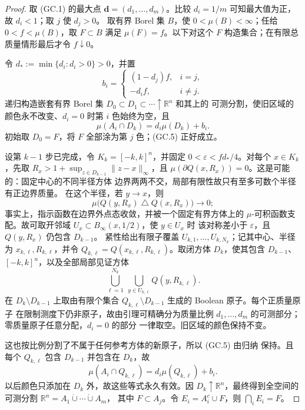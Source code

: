 \begin{proof}
取 (GC.1) 的最大点 $\boldsymbol d=(d_1,\ldots,d_m)$。比较
$d_i=1/m$ 可知最大值为正，故 $d_i<1$；取 $j$ 使 $d_j>0$。
取有界 Borel 集 $B$，使
$0<\mu(B)<\infty$；任给 $0<f<\mu(B)$，取 $F\subset B$ 满足
$\mu(F)=f$。以下对这个 $F$ 构造集合；在有限总质量情形最后才令
$f\downarrow0$。

令 $d_*:=\min\{d_i:d_i>0\}>0$，并置
\[
 b_i=\begin{cases}(1-d_j)f,&i=j,\\-d_if,&i\ne j.\end{cases} \tag{GC.4}
\]
递归构造嵌套有界 Borel 集
\(D_0\subset D_1\subset\cdots\uparrow\mathbb R^n\) 和其上的
可测分割，使旧区域的颜色永不改变、$d_i=0$ 时第 $i$ 色始终为空，且
\[
 \mu(A_i\cap D_k)=d_i\mu(D_k)+b_i. \tag{GC.5}
\]
初始取 $D_0=F$，将 $F$ 全部涂为第 $j$ 色；(GC.5) 正好成立。

设第 $k-1$ 步已完成，令 $K_k=[-k,k]^n$，并固定
$0<\varepsilon<fd_*/4$。对每个 $x\in K_k$，先取
\(R_x>1+\sup_{z\in D_{k-1}}\|z-x\|_\infty\)，且
\(\mu(\partial Q(x,R_x))=0\)。这是可能的：固定中心的不同半径方体
边界两两不交，局部有限性故只有至多可数个半径有正边界质量。
在这个半径，若 $y\to x$，则
\[
 \mu\bigl(Q(y,R_x)\mathbin\triangle Q(x,R_x)\bigr)\longrightarrow0; \tag{GC.6}
\]
事实上，指示函数在边界外点态收敛，并被一个固定有界方体上的
$\mu$-可积函数支配。故可取开邻域
\(U_x\subset B_\infty(x,1/2)\)，使 $y\in U_x$ 时
该对称差小于 $\varepsilon$，且 $Q(y,R_x)$ 仍包含 $D_{k-1}$。
紧性给出有限子覆盖 $U_{k,1},\ldots,U_{k,N_k}$；记其中心、半径为
$x_{k,\ell},R_{k,\ell}$，并令
$Q_{k,\ell}=Q(x_{k,\ell},R_{k,\ell})$。取闭方体 $D_k$，使其包含
$D_{k-1}$、$[-k,k]^n$，以及全部局部见证方体
\[
 \bigcup_{\ell=1}^{N_k}\ \bigcup_{y\in U_{k,\ell}}Q(y,R_{k,\ell}). \tag{GC.7}
\]
在 $D_k\setminus D_{k-1}$ 上取由有限个集合
$Q_{k,\ell}\setminus D_{k-1}$ 生成的 Boolean 原子。每个正质量原子
在限制测度下仍非原子，故由引理可精确分为质量比例
$d_1,\ldots,d_m$ 的可测部分；零质量原子任意分配，$d_i=0$ 的部分
一律取空。旧区域的颜色保持不变。

这也按比例分割了不属于任何参考方体的新原子，所以 (GC.5) 由归纳
保持。且每个 $Q_{k,\ell}$ 包含 $D_{k-1}$ 并包含在 $D_k$，故
\[
 \mu(A_i\cap Q_{k,\ell})=d_i\mu(Q_{k,\ell})+b_i. \tag{GC.8}
\]
以后颜色只添加在 $D_k$ 外，故这些等式永久有效。因
$D_k\uparrow\mathbb R^n$，最终得到全空间的可测分割
\(\mathbb R^n=A_1\mathbin{\dot\cup}\cdots\mathbin{\dot\cup}A_m\)，
其中 $F\subset A_j$。令 $E_i=A_i^c\cup F$，则 $\bigcap_iE_i=F$。


\end{proof}
